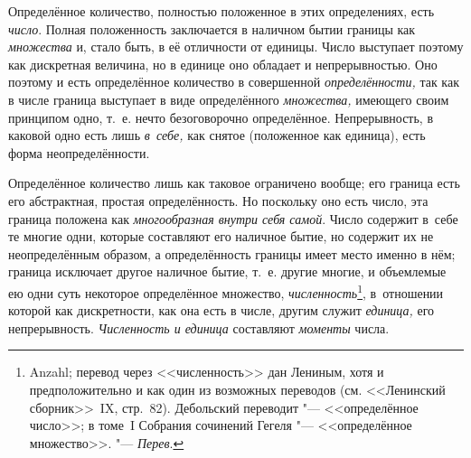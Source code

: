 Определённое количество, полностью положенное в этих определениях, есть
{\em число}. Полная положенность заключается в наличном бытии границы как
{\em множества} и, стало быть, в её отличности от единицы. Число выступает
поэтому как дискретная величина, но в единице оно обладает и непрерывностью. Оно
поэтому и есть определённое количество в совершенной
{\em определённости,} так как в числе граница выступает в виде определённого
{\em множества,} имеющего своим принципом одно, т.~е. нечто безоговорочно
определённое. Непрерывность, в каковой одно есть лишь {\em в~себе,} как снятое
(положенное как единица), есть форма неопределённости.

Определённое количество лишь как таковое ограничено вообще; его граница есть
его абстрактная, простая определённость. Но поскольку оно есть число, эта
граница положена как {\em многообразная внутри себя самой}. Число содержит в~себе те
многие одни, которые составляют его наличное бытие, но содержит их не
неопределённым образом, а определённость границы имеет место именно в нём;
граница исключает другое наличное бытие, т.~е. другие многие, и объемлемые ею
одни суть некоторое определённое множество, {\em численность}\footnote{Anzahl;
перевод через <<численность>> дан Лениным, хотя и предположительно и как один
из возможных переводов (см. <<Ленинский сборник>>~IX, стр.~82). Дебольский
переводит "--- <<определённое число>>; в томе~I Собрания сочинений Гегеля "---
<<определённое множество>>. "--- {\em Перев}.}, в~отношении которой как
дискретности, как она есть в числе, другим служит {\em единица,} его
непрерывность. {\em Численность и единица} составляют {\em моменты} числа.

